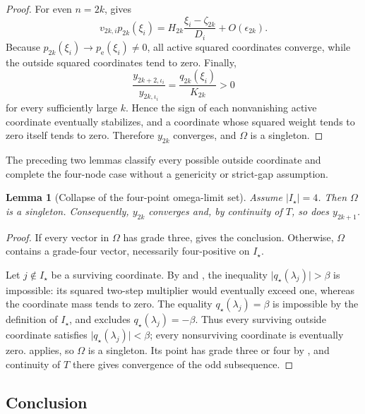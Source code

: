 \documentclass[11pt]{article}
\newtheorem{lemma}{Lemma}[section]
\begin{document}
\begin{proof}
For even \(n=2k\),  gives
\[
 v_{2k,i}p_{2k}(\xi_i)
 =H_{2k}\frac{\xi_i-\zeta_{2k}}{D_i}+O(\epsilon_{2k}).
\]
Because
\(p_{2k}(\xi_i)\to p_{\mathrm e}(\xi_i)\neq0\), all active squared
coordinates converge, while the outside squared coordinates tend to zero.
Finally,
\[
 \frac{y_{2k+2,\iota_i}}{y_{2k,\iota_i}}
 =\frac{q_{2k}(\xi_i)}{K_{2k}}>0
\]
for every sufficiently large \(k\).  Hence the sign of each nonvanishing
active coordinate eventually stabilizes, and a coordinate whose squared
weight tends to zero itself tends to zero.  Therefore \(y_{2k}\) converges,
and \(\Omega\) is a singleton.
\end{proof}

The preceding two lemmas classify every possible outside coordinate and
complete the four-node case without a genericity or strict-gap assumption.

\begin{lemma}[Collapse of the four-point omega-limit set]
\label{lem:four-point-collapse}
Assume \(\lvert I_\star\rvert=4\).  Then \(\Omega\) is a singleton.
Consequently, \(y_{2k}\) converges and, by continuity of \(T\), so does
\(y_{2k+1}\).
\end{lemma}

\begin{proof}
If every vector in \(\Omega\) has grade three,
 gives the conclusion.  Otherwise,
\(\Omega\) contains a grade-four vector, necessarily four-positive on
\(I_\star\).

Let \(j\notin I_\star\) be a surviving coordinate.  By
 and
, the inequality
\(\lvert q_\star(\lambda_j)\rvert>\beta\) is impossible: its squared
two-step multiplier would eventually exceed one, whereas the coordinate
mass tends to zero.  The equality
\(q_\star(\lambda_j)=\beta\) is impossible by the definition of
\(I_\star\), and
 excludes
\(q_\star(\lambda_j)=-\beta\).  Thus every surviving outside coordinate
satisfies
\(\lvert q_\star(\lambda_j)\rvert<\beta\); every nonsurviving coordinate
is eventually zero.   applies, so
\(\Omega\) is a singleton.  Its point has grade three or four by
, and continuity of \(T\) there gives convergence
of the odd subsequence.
\end{proof}

\subsection{Conclusion}
\end{document}
